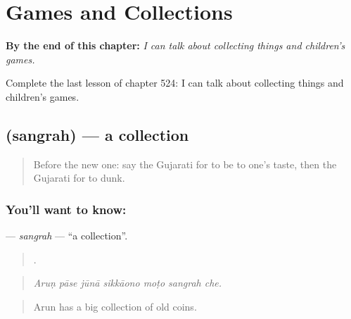 
\chapter{Games and Collections}
\label{ch:gu-games-and-collections}

\begin{chapteropening}
\textbf{By the end of this chapter:} \emph{I can talk about collecting things and children's games.}

Complete the last lesson of chapter 524: I can talk about collecting things and children's games.
\end{chapteropening}

\section[\texorpdfstring{\gu{સંગ્રહ} (sangrah)}{સંગ્રહ (sangrah)}]{ (sangrah) — a collection}

\label{lesson:GU-C524-sangrah}



\begin{quote}
Before the new one: say the Gujarati for to be to one's taste, then the Gujarati for to dunk.
\end{quote}

\subsection*{You'll want to know: }
\textbf{} — \emph{sangrah} — \textquotedblleft{}a collection\textquotedblright{}.

\begin{quote}
      .
\end{quote}

\begin{quote}
\emph{Aruṇ pāse jūnā sikkāono moṭo sangrah che.}
\end{quote}

\begin{quote}
Arun has a big collection of old coins.
\end{quote}

